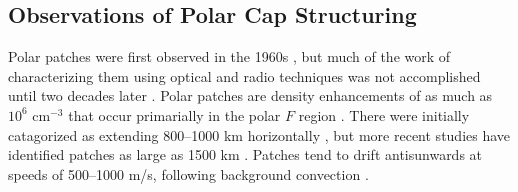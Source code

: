 



\subsection{Observations of Polar Cap Structuring}
\label{sec:lit_observations}
Polar patches were first observed in the 1960s \citep{Hill1963}, but much of the work of characterizing them using optical and radio techniques was not accomplished until two decades later \citep{Weber1981,Weber1984,Weber1986,Buchau1983,Buchau1985}.  Polar patches are density enhancements of as much as \(10^6\) cm\(^{-3}\) that occur primarially in the polar \(F\) region \citep{Buchau1983}.  There were initially catagorized as extending 800--1000 km horizontally \citep{Weber1984}, but more recent studies have identified patches as large as 1500 km \citep{Hosokawa2014}.  Patches tend to drift antisunwards at speeds of 500--1000 m/s, following background convection \citep{Buchau1983,Weber1984}.

